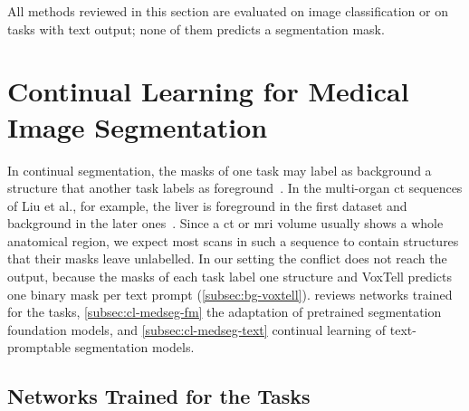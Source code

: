 All methods reviewed in this section are evaluated on image classification or on tasks with text output; none of them predicts a segmentation mask.

\section{Continual Learning for Medical Image Segmentation}
\label{sec:cl-medseg}

In continual segmentation, the masks of one task may label as background a structure that another task labels as foreground~\cite{cermelli2020modelingbackgroundincrementallearning}.
In the multi-organ \gls{ct} sequences of Liu et al., for example, the liver is foreground in the first dataset and background in the later ones~\cite{liu2022learningincrementallysegmentmultiple}.
Since a \gls{ct} or \gls{mri} volume usually shows a whole anatomical region, we expect most scans in such a sequence to contain structures that their masks leave unlabelled.
In our setting the conflict does not reach the output, because the masks of each task label one structure and VoxTell predicts one binary mask per text prompt (\cref{subsec:bg-voxtell}).
 reviews networks trained for the tasks, \cref{subsec:cl-medseg-fm} the adaptation of pretrained segmentation foundation models, and \cref{subsec:cl-medseg-text} continual learning of text-promptable segmentation models.

\subsection{Networks Trained for the Tasks}
\label{subsec:cl-medseg-net}

